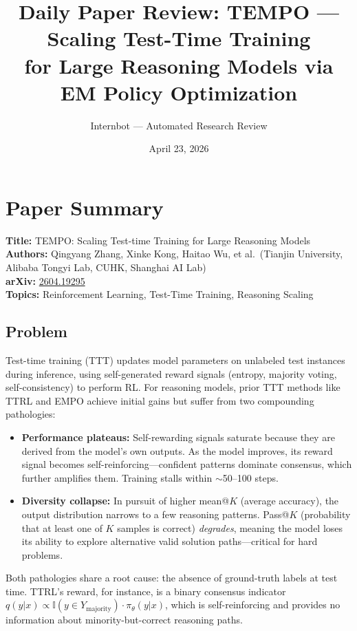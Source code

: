 \documentclass[11pt]{article}
\title{Daily Paper Review: TEMPO --- Scaling Test-Time Training\\for Large Reasoning Models via EM Policy Optimization}
\author{Internbot --- Automated Research Review}
\date{April 23, 2026}
\begin{document}
\maketitle

\section{Paper Summary}

\textbf{Title:} TEMPO: Scaling Test-time Training for Large Reasoning Models \\
\textbf{Authors:} Qingyang Zhang, Xinke Kong, Haitao Wu, et al.\ (Tianjin University, Alibaba Tongyi Lab, CUHK, Shanghai AI Lab) \\
\textbf{arXiv:} \href{https://arxiv.org/abs/2604.19295}{2604.19295} \\
\textbf{Topics:} Reinforcement Learning, Test-Time Training, Reasoning Scaling

\subsection{Problem}

Test-time training (TTT) updates model parameters on unlabeled test instances during inference, using self-generated reward signals (entropy, majority voting, self-consistency) to perform RL. For reasoning models, prior TTT methods like TTRL and EMPO achieve initial gains but suffer from two compounding pathologies:

\begin{itemize}
    \item \textbf{Performance plateaus:} Self-rewarding signals saturate because they are derived from the model's own outputs. As the model improves, its reward signal becomes self-reinforcing---confident patterns dominate consensus, which further amplifies them. Training stalls within $\sim$50--100 steps.

    \item \textbf{Diversity collapse:} In pursuit of higher mean@$K$ (average accuracy), the output distribution narrows to a few reasoning patterns. Pass@$K$ (probability that at least one of $K$ samples is correct) \textit{degrades}, meaning the model loses its ability to explore alternative valid solution paths---critical for hard problems.
\end{itemize}

Both pathologies share a root cause: the absence of ground-truth labels at test time. TTRL's reward, for instance, is a binary consensus indicator $q(y|x) \propto \mathbb{I}(y \in Y_{\mathrm{majority}}) \cdot \pi_\theta(y|x)$, which is self-reinforcing and provides no information about minority-but-correct reasoning paths.
\end{document}
